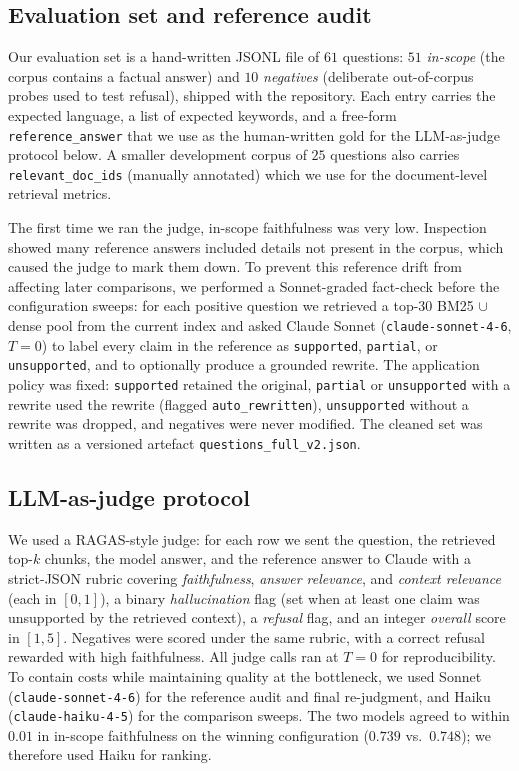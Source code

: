 \documentclass[fleqn,moreauthors,10pt]{ds_report}
\begin{document}
\subsection*{Evaluation set and reference audit}
Our evaluation set is a hand-written JSONL file of $61$ questions: $51$ \emph{in-scope} (the corpus contains a factual answer) and $10$ \emph{negatives} (deliberate out-of-corpus probes used to test refusal), shipped with the repository. Each entry carries the expected language, a list of expected keywords, and a free-form \texttt{reference\_answer} that we use as the human-written gold for the LLM-as-judge protocol below. A smaller development corpus of $25$ questions also carries \texttt{relevant\_doc\_ids} (manually annotated) which we use for the document-level retrieval metrics.

The first time we ran the judge, in-scope faithfulness was very low. Inspection showed many reference answers included details not present in the corpus, which caused the judge to mark them down. To prevent this reference drift from affecting later comparisons, we performed a Sonnet-graded fact-check before the configuration sweeps: for each positive question we retrieved a top-30 BM25 $\cup$ dense pool from the current index and asked Claude Sonnet (\texttt{claude-sonnet-4-6}, $T{=}0$) to label every claim in the reference as \texttt{supported}, \texttt{partial}, or \texttt{unsupported}, and to optionally produce a grounded rewrite. The application policy was fixed: \texttt{supported} retained the original, \texttt{partial} or \texttt{unsupported} with a rewrite used the rewrite (flagged \texttt{auto\_rewritten}), \texttt{unsupported} without a rewrite was dropped, and negatives were never modified. The cleaned set was written as a versioned artefact \texttt{questions\_full\_v2.json}.

\subsection*{LLM-as-judge protocol}
We used a RAGAS-style judge: for each row we sent the question, the retrieved top-$k$ chunks, the model answer, and the reference answer to Claude with a strict-JSON rubric covering \emph{faithfulness}, \emph{answer relevance}, and \emph{context relevance} (each in $[0,1]$), a binary \emph{hallucination} flag (set when at least one claim was unsupported by the retrieved context), a \emph{refusal} flag, and an integer \emph{overall} score in $[1,5]$. Negatives were scored under the same rubric, with a correct refusal rewarded with high faithfulness. All judge calls ran at $T{=}0$ for reproducibility. To contain costs while maintaining quality at the bottleneck, we used Sonnet (\texttt{claude-sonnet-4-6}) for the reference audit and final re-judgment, and Haiku (\texttt{claude-haiku-4-5}) for the comparison sweeps. The two models agreed to within $0.01$ in in-scope faithfulness on the winning configuration ($0.739$ vs.\ $0.748$); we therefore used Haiku for ranking.
\end{document}
